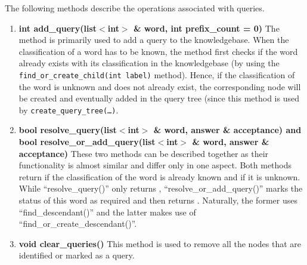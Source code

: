 \vskip 1pt
  The following methods describe the operations associated with queries.

\begin{enumerate}

\item \textbf{int add\_query(list$<$int$>$ \& word, int prefix\_count = 0)} \hfill \vskip 1pt
	The method is primarily used to add a query to the knowledgebase. When the classification of a word has to be known, the method first checks if the word already exists with its classification in the knowledgebase (by using the \texttt{find\_or\_create\_child(int label)} method). Hence, if the classification of the word is unknown and does not already exist, the corresponding node will be created and eventually added in the query tree (since this method is used by \texttt{create\_query\_tree(\ldots)}.
  	
\item \textbf{bool resolve\_query(list$<$int$>$ \& word, answer \& acceptance) and bool resolve\_or\_add\_query(list$<$int$>$ \& word, answer \& acceptance)} \hfill \vskip 1pt
	These two methods can be described together as their functionality is almost similar and differ only in one aspect. Both methods return \true if the classification of the word is already known and \false if it is unknown. While ``resolve\_query()'' only returns \false, ``resolve\_or\_add\_query()'' marks the status of this word as required and then returns \false. Naturally, the former uses ``find\_descendant()'' and the latter makes use of ``find\_or\_create\_descendant()''.

\item \textbf{void clear\_queries()} \hfill \vskip 1pt
	This method is used to remove all the nodes that are identified or marked as a query.
\end{enumerate}
\vskip 1pt
\vskip 1pt

